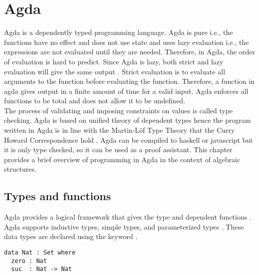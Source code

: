 \chapter{Agda}
Agda is a dependently typed programming language. Agda is pure i.e., the
functions have no effect and does not use state and uses lazy evaluation i.e.,
the expressions are not evaluated until they are needed. Therefore, in Agda, the
order of evaluation is hard to predict. Since Agda is lazy, both strict and lazy
evaluation will give the same output \cite{kidney2020finiteness}. Strict
evaluation is to evaluate all arguments to the function before evaluating the
function. Therefore, a function in agda gives output in a finite amount of time
for a valid input. Agda enforces all functions to be total and does not allow it
to be undefined. \\
The process of validating and imposing constraints on values is called type
checking. Agda is based on unified theory of dependent types
\cite{enwiki:1127496533} hence the program written in Agda is in line with the
Martin-Löf Type Theory that the Curry Howard Correspondence hold
\cite{kidney2020finiteness}. Agda can be compiled to haskell or javascript but
it is only type checked, so it can be used as a proof assistant. This chapter
provides a brief overview of programming in Agda in the context of algebraic
structures. 

\section{Types and functions}
Agda provides a logical framework that gives the type  and dependent
functions . Agda supports inductive types, simple types,
and parameterized types \cite{10.1007/978-3-642-03359-9_6}. These data types are
declared using the keyword .
\label{code:Nat}
\begin{verbatim}
data Nat : Set where
  zero : Nat
  suc  : Nat -> Nat
\end{verbatim}


